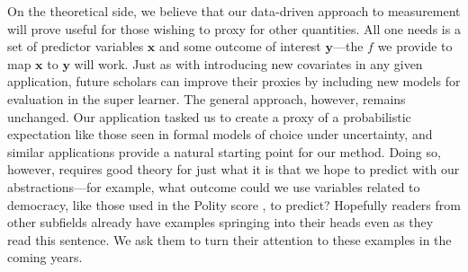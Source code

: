 On the theoretical side, we believe that our data-driven approach to measurement will prove useful for those wishing to proxy for other quantities.  All one needs is a set of predictor variables $\boldsymbol{x}$ and some outcome of interest $\boldsymbol{y}$---the $f$ we provide to map $\boldsymbol{x}$ to $\boldsymbol{y}$ will work.  Just as with introducing new covariates in any given application, future scholars can improve their proxies by including new models for evaluation in the super learner.  The general approach, however, remains unchanged.  Our application tasked us to create a proxy of a probabilistic expectation like those seen in formal models of choice under uncertainty, and similar applications provide a natural starting point for our method.  Doing so, however, requires good theory for just what it is that we hope to predict with our abstractions---for example, what outcome could we use variables related to democracy, like those used in the Polity score \citep{marshall2014}, to predict?  Hopefully readers from other subfields already have examples springing into their heads even as they read this sentence.  We ask them to turn their attention to these examples in the coming years.


